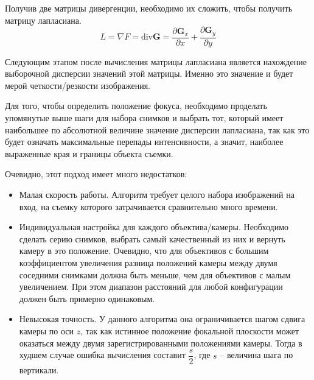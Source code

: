 Получив две матрицы дивергенции, необходимо их сложить, чтобы получить матрицу лапласиана. 
\begin{equation}
	L = \nabla F = \text{div} \textbf{G} = \frac{\partial \textbf{G}_x}{\partial x} + \frac{\partial \textbf{G}_y}{\partial y}
\end{equation}

Следующим этапом после вычисления матрицы лапласиана является нахождение выборочной дисперсии значений этой матрицы. Именно это значение и будет мерой четкости/резкости изображения.

Для того, чтобы определить положение фокуса, необходимо проделать упомянутые выше шаги для набора снимков и выбрать тот, который имеет наибольшее по абсолютной величине значение дисперсии лапласиана, так как это будет означать максимальные перепады интенсивности, а значит, наиболее выраженные края и границы объекта съемки.

Очевидно, этот подход имеет много недостатков:
\begin{itemize}
	\item Малая скорость работы. Алгоритм требует целого набора изображений на вход, на съемку которого затрачивается сравнительно много времени.
	\item Индивидуальная настройка для каждого объектива/камеры. Необходимо сделать серию снимков, выбрать самый качественный из них и вернуть камеру в это положение. Очевидно, что для объективов с большим коэффициентом увеличения разница положений камеры между двумя соседними снимками должна быть меньше, чем для объективов с малым увеличением. При этом диапазон расстояний для любой конфигурации должен быть примерно одинаковым.
	\item Невысокая точность. У данного алгоритма она ограничивается шагом сдвига камеры по оси $z$, так как истинное положение фокальной плоскости может оказаться между двумя зарегистрированными положениями камеры. Тогда в худшем случае ошибка вычисления составит $\dfrac{s}{2}$, где $s$ -- величина шага по вертикали.
\end{itemize}

